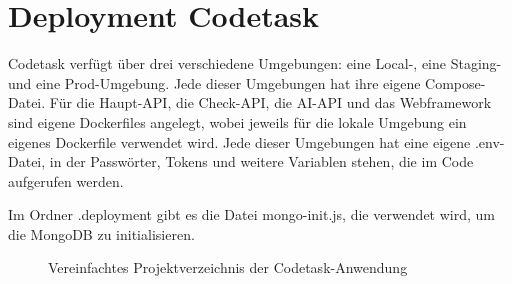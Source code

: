 \section{Deployment Codetask}

Codetask verfügt über drei verschiedene Umgebungen: eine Local-, eine Staging- und eine Prod-Umgebung. 
Jede dieser Umgebungen hat ihre eigene Compose-Datei. Für die Haupt-API, die Check-API, die AI-API und das Webframework sind eigene Dockerfiles angelegt, wobei jeweils für die lokale Umgebung ein eigenes Dockerfile verwendet wird. 
Jede dieser Umgebungen hat eine eigene .env-Datei, in der Passwörter, Tokens und weitere Variablen stehen, die im Code aufgerufen werden.

Im Ordner .deployment gibt es die Datei mongo-init.js, die verwendet wird, um die MongoDB zu initialisieren.
\begin{figure}[htbp]


\caption{Vereinfachtes Projektverzeichnis der Codetask-Anwendung}
\label{fig:projektstruktur}

\end{figure}

\FloatBarrier

